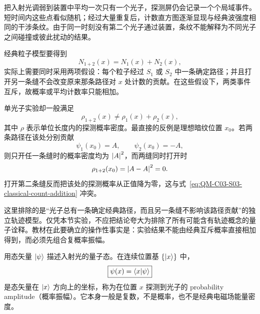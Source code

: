 
把入射光调弱到装置中平均一次只有一个光子，探测屏仍会记录一个个局域事件。短时间内这些点看似随机；经过大量重复后，计数直方图逐渐显现与经典波强度相同的干涉条纹。由于同一时刻没有第二个光子通过装置，条纹不能解释为不同光子之间碰撞或彼此扰动的结果。

经典粒子模型要得到
\begin{equation}
  N_{1+2}(x)=N_1(x)+N_2(x),
  \label{eq:QM-C03-S03-classical-count-addition}
\end{equation}
实际上需要同时采用两项假设：每个粒子经过 $S_1$ 或 $S_2$ 中一条确定路径；并且打开另一条缝不会改变原来那条路径对 $x$ 处计数的贡献。在这些假设下，两类事件互斥，故概率或平均计数率只能相加。

单光子实验却一般满足
\begin{equation}
  \boxed{\rho_{1+2}(x)\neq\rho_1(x)+\rho_2(x)},
  \label{eq:QM-C03-S03-nonclassical-probability-addition}
\end{equation}
其中 $\rho$ 表示单位长度内的探测概率密度。最直接的反例是理想暗纹位置 $x_0$。若两条路径在该处分别贡献
\begin{equation}
  \psi_1(x_0)=A,
  \qquad
  \psi_2(x_0)=-A,
  \label{eq:QM-C03-S03-dark-fringe-amplitudes}
\end{equation}
则只开任一条缝时的概率密度均为 $\left|A\right|^2$，而两缝同时打开时
\begin{equation}
  \rho_{1+2}(x_0)
  =\left|A-A\right|^2=0.
  \label{eq:QM-C03-S03-dark-fringe-probability}
\end{equation}
打开第二条缝反而把该处的探测概率从正值降为零，这与式~\eqref{eq:QM-C03-S03-classical-count-addition} 冲突。

这里排除的是“光子总有一条确定经典路径，而且另一条缝不影响该路径贡献”的独立轨迹模型。仅凭本节实验，不应把结论夸大为排除了所有可能含有轨迹概念的量子诠释。教材在此要确立的操作性事实是：实验结果不能由经典互斥概率直接相加得到，而必须先组合复概率振幅。


用态矢量 $\left|\psi\right\rangle$ 描述入射光的量子态。在连续位置基 $\{\left|x\right\rangle\}$ 中，
\begin{equation}
  \boxed{\psi(x)=\left\langle x \middle| \psi \right\rangle}
  \label{eq:QM-C03-S03-position-amplitude}
\end{equation}
是态矢量在 $\left|x\right\rangle$ 方向上的坐标，称为在位置 $x$ 探测到光子的 probability amplitude（概率振幅）。它本身一般是复数，不是概率，也不是经典电磁场能量密度。


